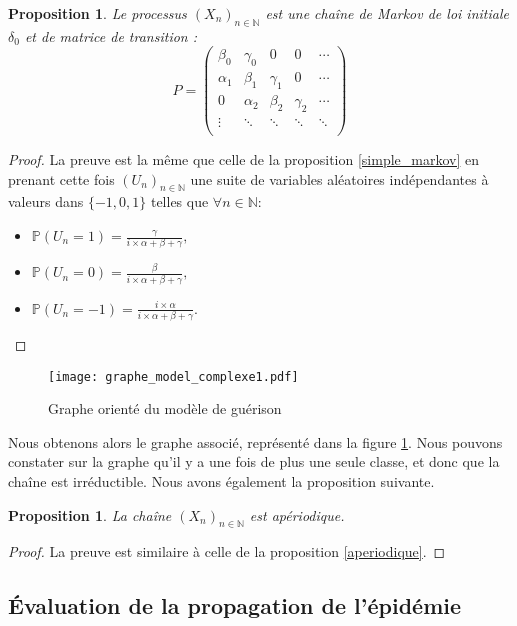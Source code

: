 \documentclass[12pt,a4paper]{report}
\newtheorem{prop}[thm]{Proposition}
\theoremstyle{remark}
\begin{document}
\begin{prop}
Le processus $(X_n)_{n \in \mathbb{N}}$ est une chaîne de Markov de loi initiale $\delta_0$ et de matrice de transition :
$$P=
\begin{pmatrix}
        \beta_0 & \gamma_0 & 0 & 0 & \cdots \\ 
         \alpha_1 & \beta_1 & \gamma_1 & 0 & \cdots\\
         0 & \alpha_2 & \beta_2 & \gamma_2 & \cdots\\
        \vdots &\ddots & \ddots & \ddots & \ddots \\ 
\end{pmatrix}$$
\end{prop}
\begin{proof}
La preuve est la même que celle de la proposition \ref{simple_markov} en prenant cette fois $(U_n)_{n\in \mathbb{N}}$ une suite de variables aléatoires indépendantes à valeurs dans $\{-1, 0, 1\}$ telles que $\forall n \in \mathbb{N}$: \\
\begin{itemize}
    \item $\mathbb{P}(U_n=1)= \frac{\gamma}{i \times \alpha+\beta+\gamma},$
    \item $\mathbb{P}(U_n=0)= \frac{\beta}{i \times \alpha+\beta+\gamma},$
    \item $\mathbb{P}(U_n=-1)= \frac{i \times \alpha}{i \times \alpha+\beta+\gamma}.$
\end{itemize}
\end{proof}

\begin{figure}[h!]
    \centering
    \texttt{[image: graphe\_model\_complexe1.pdf]} 
   \caption{Graphe orienté du modèle de guérison}
    \label{fig:graph}
\end{figure}

Nous obtenons alors le graphe associé, représenté dans la figure \ref{fig:graph}. Nous pouvons constater sur la graphe qu'il y a une fois de plus une seule classe, et donc que la chaîne est irréductible. Nous avons également la proposition suivante.
\begin{prop}\label{aperiodique_guerison}
La chaîne $(X_n)_{n \in \mathbb{N}}$ est apériodique.
\end{prop}
\begin{proof}
La preuve est similaire à celle de la proposition \ref{aperiodique}.
\end{proof}

\subsection{Évaluation de la propagation de l'épidémie}
\vspace{0.6cm}
\end{document}
